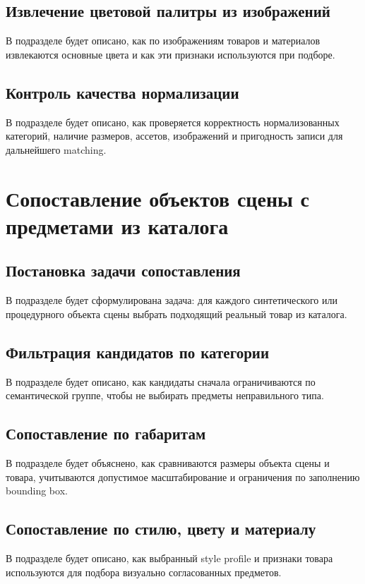 \documentclass[times]{itmo-student-thesis}
\begin{document}
\subsection{Извлечение цветовой палитры из изображений}
В подразделе будет описано, как по изображениям товаров и материалов извлекаются основные цвета и как эти признаки используются при подборе.

\subsection{Контроль качества нормализации}
В подразделе будет описано, как проверяется корректность нормализованных категорий, наличие размеров, ассетов, изображений и пригодность записи для дальнейшего matching.

\section{Сопоставление объектов сцены с предметами из каталога}

\subsection{Постановка задачи сопоставления}
В подразделе будет сформулирована задача: для каждого синтетического или процедурного объекта сцены выбрать подходящий реальный товар из каталога.

\subsection{Фильтрация кандидатов по категории}
В подразделе будет описано, как кандидаты сначала ограничиваются по семантической группе, чтобы не выбирать предметы неправильного типа.

\subsection{Сопоставление по габаритам}
В подразделе будет объяснено, как сравниваются размеры объекта сцены и товара, учитываются допустимое масштабирование и ограничения по заполнению bounding box.

\subsection{Сопоставление по стилю, цвету и материалу}
В подразделе будет описано, как выбранный style profile и признаки товара используются для подбора визуально согласованных предметов.
\end{document}
